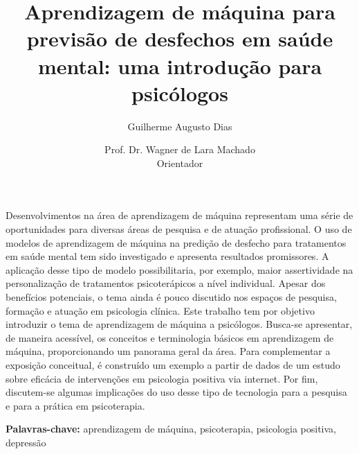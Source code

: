 \documentclass{article}
\title{Aprendizagem de máquina para previsão de desfechos em saúde mental: uma introdução para psicólogos}
\author{Guilherme Augusto Dias \vspace{1em} \and Prof. Dr. Wagner de Lara Machado \\ Orientador}
\date{}
\providecommand{\keywords}[1]{
    \vspace{1em}
    \noindent \textbf{Palavras-chave:} #1
}
\begin{document}
\maketitle

Desenvolvimentos na área de aprendizagem de máquina representam uma série de oportunidades para diversas áreas de pesquisa e de atuação profissional.
O uso de modelos de aprendizagem de máquina na predição de desfecho para tratamentos em saúde mental tem sido investigado e apresenta resultados promissores.
A aplicação desse tipo de modelo possibilitaria, por exemplo, maior assertividade na personalização de tratamentos psicoterápicos a nível individual.
Apesar dos benefícios potenciais, o tema ainda é pouco discutido nos espaços de pesquisa, formação e atuação em psicologia clínica. Este trabalho tem
por objetivo introduzir o tema de aprendizagem de máquina a psicólogos. Busca-se apresentar, de maneira acessível, os conceitos e terminologia básicos
em aprendizagem de máquina, proporcionando um panorama geral da área. Para complementar a exposição conceitual, é construído um exemplo a partir de dados
de um estudo sobre eficácia de intervenções em psicologia positiva via internet. Por fim, discutem-se algumas implicações do uso desse tipo de tecnologia
para a pesquisa e para a prática em psicoterapia.

\keywords{aprendizagem de máquina, psicoterapia, psicologia positiva, depressão}
\end{document}
